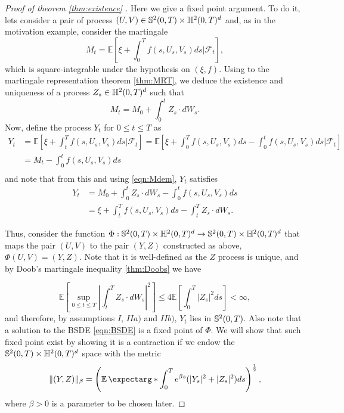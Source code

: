\begin{proof}[Proof of theorem \ref{thm:existence} ]
Here we give a fixed point argument. To do it, lets consider a pair of process $(U,V)\in\mathbb{S}^2(0,T)\times\mathbb{H}^2(0,T)^d$ and, as in the motivation example, consider the martingale
\begin{equation}
	M_t=\mathbb{E}\left[\xi +\int_{0}^{T}f(s,U_s,V_s)ds \Bigg| \mathcal{F}_t \right],
\end{equation}
which is square-integrable under the hypothesis on $(\xi,f)$. Using to the martingale representation theorem \ref{thm:MRT}, we deduce the existence and uniqueness of a process $Z_s\in \mathbb{H}^2(0,T)^d$ such that
\begin{equation}
	\label{eqn:Mdem}
	M_t=M_0+\int_{0}^{t}Z_s \cdot dW_s.
\end{equation}
Now, define the process $Y_t$ for $0\leq t\leq T$ as
\begin{equation}
	\begin{split}
	Y_t&=\mathbb{E}\left[\xi +\int_{t}^{T}f(s,U_s,V_s)ds \Bigg| \mathcal{F}_t \right]=\mathbb{E}\left[\xi +\int_{0}^{T}f(s,U_s,V_s)ds-\int_{0}^{t}f(s,U_s,V_s)ds  \Bigg| \mathcal{F}_t \right]\\
	&=M_t-\int_{0}^{t}f(s,U_s,V_s)ds\\
	\end{split}
\end{equation}
and note that from this and using \eqref{eqn:Mdem}, $Y_t$ satisfies 
\begin{equation}
	\label{eqn:SdeY}
	\begin{split}
		Y_t&=M_0+\int_{0}^{t}Z_s \cdot dW_s-\int_{0}^{t}f(s,U_s,V_s)ds\\
		&=\xi+\int_{t}^{T}f(s,U_s,V_s)ds-\int_{t}^{T} Z_s\cdot dW_s.
	\end{split}
\end{equation}


Thus, consider the function $\Phi:\mathbb{S}^2(0,T)\times\mathbb{H}^2(0,T)^d \to \mathbb{S}^2(0,T)\times\mathbb{H}^2(0,T)^d$ that maps the pair $(U,V)$ to the pair $(Y,Z)$ constructed as above, $\Phi(U,V)=(Y,Z)$. Note that it is well-defined as the $Z$ process is unique, and by Doob's martingale inequality \ref{thm:Doobs} we have

\begin{equation}
	\mathbb{E}\left[\sup_{0\leq t\leq T}\left|\int_{t}^{T}Z_s\cdot dW_s\right|^2\right]\leq 4\mathbb{E}\left[\int_{0}^{T}|Z_s|^2ds\right]<\infty,
\end{equation}
and therefore, by assumptions $I$, $II a)$ and $II b)$, $Y_t$ lies in $\mathbb{S}^2(0,T)$. Also note that a solution to the BSDE \eqref{eqn:BSDE} is a fixed point of $\Phi$. We will show that such fixed point exist by showing it is a contraction if we endow the $\mathbb{S}^2(0,T)\times\mathbb{H}^2(0,T)^d$ space with the metric 
\begin{equation}
	\lVert(Y,Z)\rVert_\beta=\left(\expect*{\int_{0}^{T}e^{\beta s}(  |Y_s|^2+|Z_s|^2)ds}\right)^{\frac{1}{2}},
\end{equation}
where $\beta>0$ is a parameter to be chosen later.


\end{proof}
